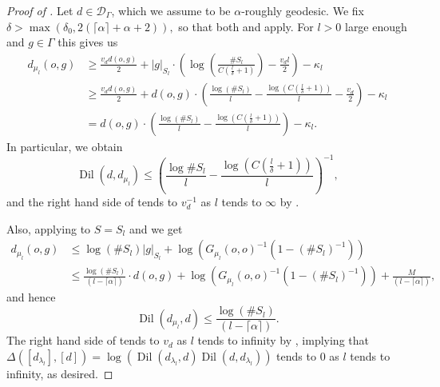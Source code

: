 \documentclass[10pt,a4paper]{amsart}
\newcommand{\Del}{\Delta}
\DeclareMathOperator{\Dil}{Dil}
\newcommand{\G}{\Gamma}
\newcommand{\al}{\alpha}
\newcommand{\calD}{\mathcal{D}}
\newcommand{\del}{\delta}
\renewcommand{\k}{\kappa}
\newcommand{\lam}{\lambda}
\newcommand{\m}{\mu}
\begin{document}
\begin{proof}[Proof of ]
    Let $d\in \calD_\G$, which we assume to be $\al$-roughly geodesic. We fix $\del>\max(\del_0,2(\lceil \al\rceil+\al+2)),$ so that both  and   apply. For $l>0$ large enough and $g\in \G$ this gives us 
    \begin{align*}
                d_{\m_l}(o,g) &\geq \frac{v_dd(o,g)}{2}+|g|_{S_l}\cdot \left(\log\left(\frac{\#S_l}{C\left(\frac{l}{\del}+1\right)}\right)-\frac{v_d l}{2}\right)-\k_l\\
                & \geq  \frac{v_dd(o,g)}{2}+d(o,g)\cdot \left(\frac{\log(\# S_l)}{l}-\frac{\log(C\left(\frac{l}{\del}+1\right))}{l}-\frac{v_d}{2}\right)-\k_l\\
                & = d(o,g)\cdot \left(\frac{\log(\# S_l)}{l}-\frac{\log(C\left(\frac{l}{\del}+1\right))}{l}\right)-\k_l.
    \end{align*}    
In particular, we obtain
    \begin{equation}\label{eq.ineqDil1}
        \Dil(d,d_{\m_l})\leq \left(\frac{\log{\# S_l}}{l}-\frac{\log(C(\frac{l}{\del}+1))}{l}\right)^{-1},
    \end{equation}
 and the right hand side of  tends to $v_d^{-1}$ as $l$ tends to  $\infty$ by .

 Also, applying  to $S=S_l$ and  we get
\begin{align*}
    d_{\m_l}(o,g)& \leq \log(\# S_l)|g|_{S_l}+\log(G_{\m_l}(o,o)^{-1}(1-(\#S_l)^{-1})) \\
    & \leq \frac{\log(\# S_l)}{(l-\lceil \al\rceil)}\cdot d(o,g)+\log(G_{\m_l}(o,o)^{-1}(1-(\#S_l)^{-1}))+\frac{M}{(l-\lceil \al \rceil)}, 
\end{align*}
and hence
\begin{equation}\label{eq.greenDil2}
    \Dil(d_{\m_l},d)\leq  \frac{\log(\# S_l)}{(l-\lceil \al\rceil)}.
\end{equation}
 The right hand side of  tends to $v_d$ as $l$ tends to infinity by , implying that  $\Del([d_{\lam_l}],[d])=\log(\Dil(d_{\lam_l},d)\Dil(d,d_{\lam_l}))$ tends to $0$ as $l$ tends to infinity, as desired.
\end{proof}
\end{document}
